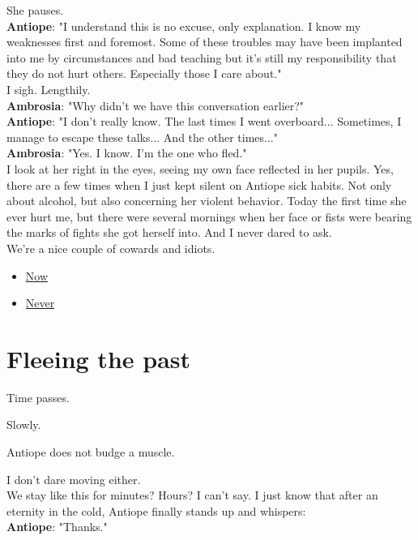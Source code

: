 \documentclass{report}
\newcommand{\speaker}[1]{
	\textbf{#1}: 
}
\newcommand{\glink}[2]{
	\hyperref[#1]{#2}
}
\newcommand{\gsection}[1]{
	\section*{#1}
	\label{#1}
}
\begin{document}
She pauses.\\

\speaker{Antiope} "I understand this is no excuse, only explanation. I know my weaknesses first and foremost. Some of these troubles may have been implanted into me by circumstances and bad teaching but it's still my responsibility that they do not hurt others. Especially those I care about."\\

I sigh. Lengthily.\\

\speaker{Ambrosia} "Why didn't we have this conversation earlier?"\\

\speaker{Antiope} "I don't really know. The last times I went overboard... Sometimes, I manage to escape these talks... And the other times..."\\

\speaker{Ambrosia} "Yes. I know. I'm the one who fled."\\

I look at her right in the eyes, seeing my own face reflected in her pupils. Yes, there are a few times when I just kept silent on Antiope sick habits. Not only about alcohol, but also concerning her violent behavior. Today the first time she ever hurt me, but there were several mornings when her face or fists were bearing the marks of fights she got herself into. And I never dared to ask.\\

We're a nice couple of cowards and idiots.\\

\begin{itemize}
	\item \glink{Declaration}{Now}
	\item \glink{Friends}{Never}
\end{itemize}

\gsection{Fleeing the past}

Time passes.

Slowly.

Antiope does not budge a muscle.

I don't dare moving either.\\

We stay like this for minutes? Hours? I can't say. I just know that after an eternity in the cold, Antiope finally stands up and whispers:\\

\speaker{Antiope} "Thanks."\\
\end{document}
